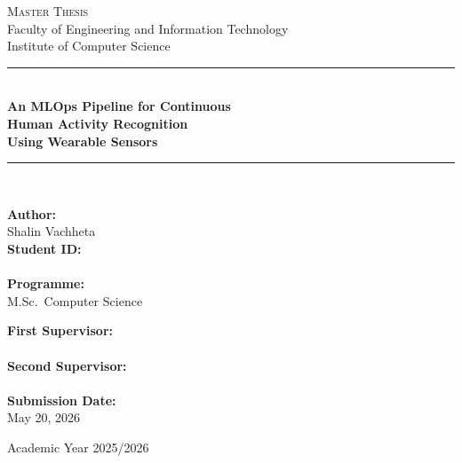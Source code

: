 \begin{titlepage}
  \centering
  \vspace*{1.5cm}


  {\scshape\Large Master Thesis}\\[0.4cm]
  {\large Faculty of Engineering and Information Technology}\\[0.2cm]
  {\large Institute of Computer Science}\\[2cm]

  \rule{\textwidth}{1.5pt}\\[0.4cm]
  {\huge\bfseries An MLOps Pipeline for Continuous\\[0.3cm]
  Human Activity Recognition\\[0.3cm]
  Using Wearable Sensors}\\[0.4cm]
  \rule{\textwidth}{1.5pt}\\[2cm]

  \begin{minipage}[t]{0.45\textwidth}
    \raggedright
    \textbf{Author:}\\
    Shalin Vachheta\\[0.5cm]
    \textbf{Student ID:}\\
    \\[0.5cm]
    \textbf{Programme:}\\
    M.Sc.\ Computer Science
  \end{minipage}
  \hfill
  \begin{minipage}[t]{0.45\textwidth}
    \raggedleft
    \textbf{First Supervisor:}\\
    \\[0.5cm]
    \textbf{Second Supervisor:}\\
    \\[0.5cm]
    \textbf{Submission Date:}\\
    May 20, 2026
  \end{minipage}

  \vfill
  {\large Academic Year 2025/2026}
\end{titlepage}
